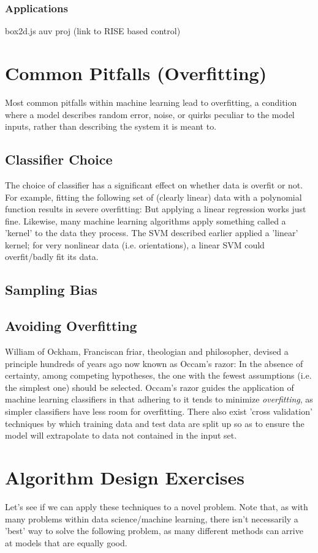 \documentclass[11pt]{article}
\begin{document}
\subsubsection{Applications}
box2d.js
auv proj (link to RISE based control)

\section{Common Pitfalls (Overfitting)}
Most common pitfalls within machine learning lead to overfitting, a condition where a model describes random error, noise, or quirks peculiar to the model inputs, rather than describing the system it is meant to.
\subsection{Classifier Choice}
The choice of classifier has a significant effect on whether data is overfit or not. For example, fitting the following set of (clearly linear) data with a polynomial function results in severe overfitting: 
But applying a linear regression works just fine. Likewise, many machine learning algorithms apply something called a 'kernel' to the data they process. The SVM described earlier applied a 'linear' kernel; for very nonlinear data (i.e. orientations), a linear SVM could overfit/badly fit its data.
\subsection{Sampling Bias}
\subsection{Avoiding Overfitting}
William of Ockham, Franciscan friar, theologian and philosopher, devised a principle hundreds of years ago now known as Occam's razor: In the absence of certainty, among competing hypotheses, the one with the fewest assumptions (i.e. the simplest one) should be selected. Occam's razor guides the application of machine learning classifiers in that adhering to it tends to minimize \textit{overfitting}, as simpler classifiers have less room for overfitting. There also exist 'cross validation' techniques by which training data and test data are split up so as to ensure the model will extrapolate to data not contained in the input set.

\section{Algorithm Design Exercises}
Let's see if we can apply these techniques to a novel problem. Note that, as with many problems within data science/machine learning, there isn't necessarily a 'best' way to solve the following problem, as many different methods can arrive at models that are equally good.
\end{document}
